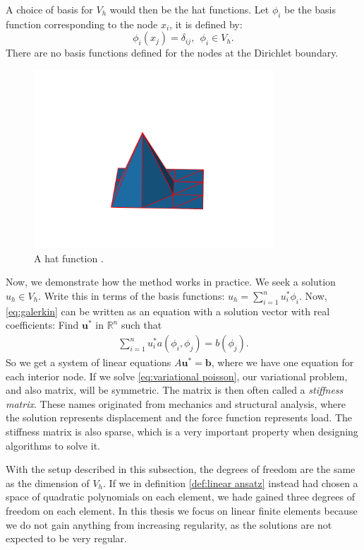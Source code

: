 \documentclass[../Main/main.tex]{subfiles}
\begin{document}
	A choice of basis for $V_h$ would then be the hat functions.  Let $\phi_i$ be the basis function corresponding to the node $x_i$, it is defined by:
	\begin{equation*}
		\phi_i(x_j) = \delta_{ij}, \ \ \phi_i \in V_h.
	\end{equation*}
	There are no basis functions defined for the nodes at the Dirichlet boundary.
	\begin{figure}[H]
		\centering
		\includegraphics[width=0.8\textwidth]{hat_function_python_plot_2.pdf}
		\caption{A hat function .}
		\label{fig:hat1}
	\end{figure}
	Now, we demonstrate how the method works in practice. We seek a solution $u_h \in V_h$. Write this in terms of the basis functions: $u_h = \sum_{i=1}^n u_i^* \phi_i$. Now, \eqref{eq:galerkin} can be written as an equation with a solution vector with real coefficients: Find $\bm{u}^*$ in $\mathbb{R}^n$ such that
	\begin{equation}\label{eq:fem system}
		\begin{gathered}
			\sum_{i=1}^n u_i^*  a(\phi_i,\phi_j) = b(\phi_j).
		\end{gathered}
	\end{equation}
	So we get a system of linear equations $A\bm{u}^* = \bm{b}$, where we have one equation for each interior node. If we solve \eqref{eq:variational poisson}, our variational problem, and also matrix, will be symmetric. The matrix is then often called a \emph{stiffness matrix}. These names originated from mechanics and structural analysis, where the solution represents displacement and the force function represents load. The stiffness matrix is also sparse, which is a very important property when designing algorithms to solve it.\par
	With the setup described in this subsection, the degrees of freedom are the same as the dimension of $V_h$. If we in definition \ref{def:linear ansatz} instead had chosen a space of quadratic polynomials on each element, we hade gained three degrees of freedom on each element. In this thesis we focus on linear finite elements because we do not gain anything from increasing regularity, as the solutions are not expected to be very regular. 
\end{document}
